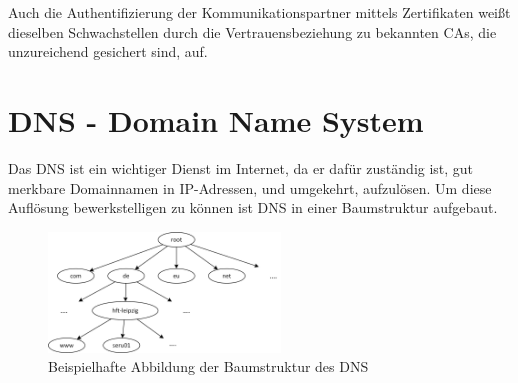 \documentclass  [paper=a4,
				fontsize=12pt,
				listof=totoc,
				bibliography=totoc
				]{scrreprt}
\begin{document}
			Auch die Authentifizierung der Kommunikationspartner mittels Zertifikaten weißt dieselben Schwachstellen durch die Vertrauensbeziehung zu bekannten \acp{CA}, die unzureichend gesichert sind, auf.  
	\section{DNS - Domain Name System}
	\label{sec:dns}
		Das \ac{DNS} ist ein wichtiger Dienst im Internet, da er dafür zuständig ist, gut merkbare Domainnamen in \ac{IP}-Adressen, und umgekehrt, aufzulösen.
		Um diese Auflösung bewerkstelligen zu können ist \ac{DNS} in einer Baumstruktur aufgebaut.
		
		\begin{figure}
			\vspace{-12pt}
			\centering
			\includegraphics[width=0.55\textwidth]{images/Baumstruktur_DNS.png}
			\caption[Baumstruktur des DNS]{Beispielhafte Abbildung der Baumstruktur des \ac{DNS}\footnotemark}
			\label{img:baumstruktur_dns}
			\vspace{-12pt}
		\end{figure}
		
\end{document}
